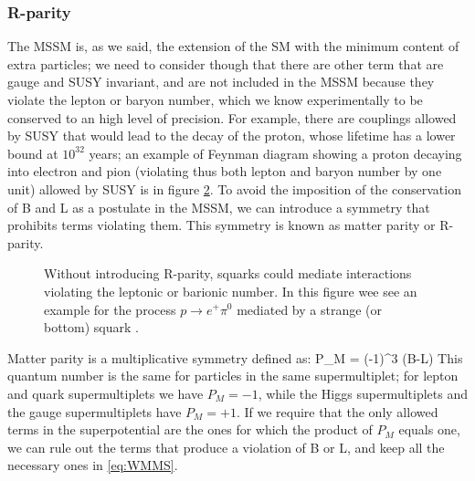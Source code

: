 \begin{figure}
\begin{center}
\end{center}
\caption{}
\label{fig:topint2}
\end{figure}


\subsubsection{R-parity}
\label{sec:rpar}
The MSSM is, as we said, the extension of the SM with the minimum content of extra particles; we need to consider though that there are other term that are gauge and SUSY invariant, and are not included in the MSSM because they violate the lepton or baryon number, which we know experimentally to be conserved to an high level of precision. For example, there are couplings allowed by SUSY that would lead to the decay of the proton, whose lifetime has a lower bound at $10^{32}$ years; an example of Feynman diagram showing a proton decaying into electron and pion (violating thus both lepton and baryon number by one unit) allowed by SUSY is in figure \ref{fig:Rpar}. To avoid the imposition of the conservation of B and L as a postulate in the MSSM, we can introduce a symmetry that prohibits terms violating them. This symmetry is known as matter parity or R-parity. 

\begin{figure}
\begin{center}
\end{center}
\caption[R-parity violating process]{Without introducing R-parity, squarks could mediate interactions violating the leptonic or barionic number. In this figure wee see an example for the process $p \rightarrow e^+ \pi^0$ mediated by a strange (or bottom) squark \cite{martin:primer}.}
\label{fig:Rpar}
\end{figure}

Matter parity is a multiplicative symmetry defined as:
\beq
P_M = (-1)^{3 (B-L)} 
\label{eq:defmatterparity}
\eeq
This quantum number is the same for particles in the same supermultiplet; for lepton and quark supermultiplets we have $P_M =-1$, while the Higgs supermultiplets and the gauge supermultiplets have $P_M =+1$. If we require that the only allowed terms in the superpotential are the ones for which the product of $P_M$ equals one, we can rule out the terms that produce a violation of B or L, and keep all the necessary ones in \ref{eq:WMMS}. 

